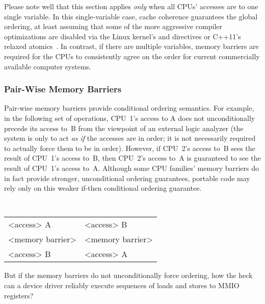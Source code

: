 Please note well that this section applies \emph{only} when all
CPUs' accesses are to one single variable.
In this single-variable case, cache coherence guarantees the
global ordering, at least assuming that some of the more aggressive
compiler optimizations are disabled via the Linux kernel's
 and  directives or C++11's relaxed
atomics~\cite{PeteBecker2011N3242}.
In contrast, if there are multiple variables, memory barriers are
required for the CPUs to consistently agree on the order for current
commercially available computer systems.

\subsubsection{Pair-Wise Memory Barriers}

Pair-wise memory barriers provide conditional ordering semantics.
For example, in the following set of operations, CPU~1's access to
A does not unconditionally precede its access to~B from the viewpoint
of an external logic analyzer
	 {(the system is only to act \emph{as if} the accesses
	  are in order; it is not necessarily required to actually
	  force them to be in order).}
However, if CPU~2's access to~B sees the result of CPU~1's access
to~B, then CPU~2's access to~A is guaranteed to see the result of
CPU~1's access to~A.
Although some CPU families' memory barriers do in fact provide stronger,
unconditional ordering guarantees, portable code may rely only
on this weaker if-then conditional ordering guarantee.

\vspace{5pt}
\begin{minipage}[t]{\columnwidth}
\tt
\scriptsize
\begin{tabular}{l|l}
	\nf{CPU 1}	& \nf{CPU 2} \\
	\hline
	<access> A	& <access> B \\
	<memory barrier>& <memory barrier> \\
	<access> B	& <access> A \\
\end{tabular}
\end{minipage}
\vspace{5pt}

\QuickQuiz{}
	But if the memory barriers do not unconditionally force
	ordering, how the heck can a device driver reliably execute
	sequences of loads and stores to MMIO registers?
 \QuickQuizEnd

